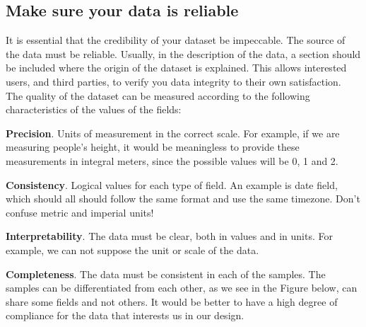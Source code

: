 \subsection{Make sure your data is reliable}

It is essential that the credibility of your dataset be impeccable. The source of the data must be reliable.
Usually, in the description of the data, a section should be included where the origin of the dataset is explained.
This allows interested users, and third parties, to verify you data integrity to their own satisfaction. \\

The quality of the dataset can be measured according to the following characteristics of the values of the fields:

\begin{itemized}
    \item \textbf{Precision}. Units of measurement in the correct scale. For example, if we are measuring people's height, it 
    would be meaningless to provide these measurements in integral meters, since the possible values will be 0, 1 and 2. \\

    \item \textbf{Consistency}. Logical values for each type of field. An example is date field, which should all should
    follow the same format and use the same timezone. Don't confuse metric and imperial units!\\

    \item \textbf{Interpretability}. The data must be clear, both in values and in units. For example, we can not
    suppose the unit or scale of the data.

    \item \textbf{Completeness}. The data must be consistent in each of the samples. The samples can be differentiated
    from each other, as we see in the Figure below, can share some fields and not others. It would be
    better to have a high degree of compliance for the data that interests us in our design.
\end{itemized}

